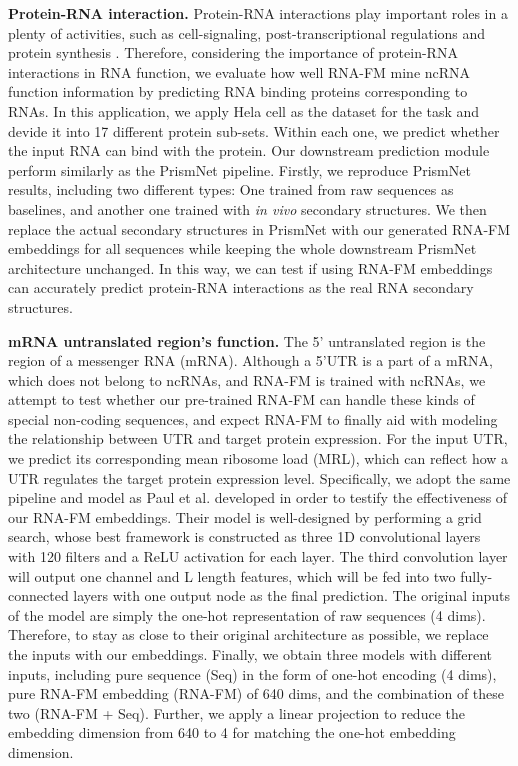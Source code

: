\textbf{Protein-RNA interaction.} 
Protein-RNA interactions play important roles in a plenty of activities, such as cell-signaling, post-transcriptional regulations and protein synthesis \citep{wei2021protein}. Therefore, considering the importance of protein-RNA interactions in RNA function, we evaluate how well RNA-FM mine ncRNA function information by predicting RNA binding proteins corresponding to RNAs. In this application, we apply Hela cell as the dataset for the task and devide it into 17 different protein sub-sets. Within each one, we predict whether the input RNA can bind with the protein. Our downstream prediction module perform similarly as the PrismNet \cite{sun2021predicting} pipeline. Firstly, we reproduce PrismNet results, including two different types: One trained from raw sequences as baselines, and another one trained with \textit{in vivo} secondary structures. We then replace the actual secondary structures in PrismNet with our generated RNA-FM embeddings for all sequences while keeping the whole downstream PrismNet architecture unchanged. In this way, we can test if using RNA-FM embeddings can accurately predict protein-RNA interactions as the real RNA secondary structures.


\textbf{mRNA untranslated region's function.} 
The 5' untranslated region is the region of a messenger RNA (mRNA). Although a 5'UTR is a part of a mRNA, which does not belong to ncRNAs, and RNA-FM is trained with ncRNAs, we attempt to test whether our pre-trained RNA-FM can handle these kinds of special non-coding sequences, and expect RNA-FM to finally aid with modeling the relationship between UTR and target protein expression. For the input UTR, we predict its corresponding mean ribosome load (MRL), which can reflect how a UTR regulates the target protein expression level. Specifically, we adopt the same pipeline and model as Paul et al. \cite{sample2019human} developed in order to testify the effectiveness of our RNA-FM embeddings. Their model is well-designed by performing a grid search, whose best framework is constructed as three 1D convolutional layers with 120 filters and a ReLU activation for each layer. The third convolution layer will output one channel and L length features, which will be fed into two fully-connected layers with one output node as the final prediction. The original inputs of the model are simply the one-hot representation of raw sequences (4 dims). Therefore, to stay as close to their original architecture as possible, we replace the inputs with our embeddings. Finally, we obtain three models with different inputs, including pure sequence (Seq) in the form of one-hot encoding (4 dims), pure RNA-FM embedding (RNA-FM) of 640 dims, and the combination of these two (RNA-FM + Seq). Further, we apply a linear projection to reduce the embedding dimension from 640 to 4 for matching the one-hot embedding dimension.

